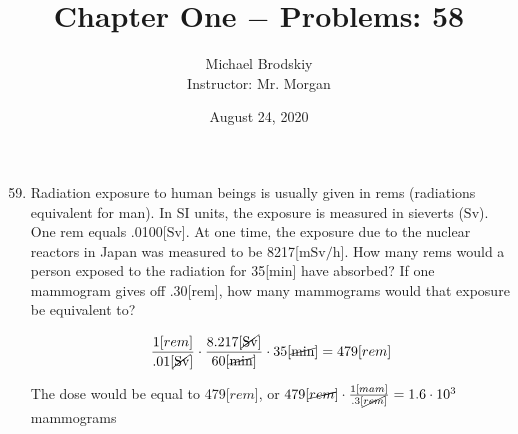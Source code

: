 \documentclass[12pt]{article}
\title{Chapter One $-$ Problems: 58}
\date{August 24, 2020}
\author{Michael Brodskiy\\ \small Instructor: Mr. Morgan}
\begin{document}
\maketitle

\begin{enumerate}
    \setcounter{enumi}{58}

  \item Radiation exposure to human beings is usually given in rems (radiations equivalent for man). In SI units, the exposure is measured in sieverts ($\si{\sievert}$). One rem equals .0100[$\si{\sievert}$]. At one time, the exposure due to the nuclear reactors in Japan was measured to be 8217[$\si{\milli\sievert\per\hour}$]. How many rems would a person exposed to the radiation for 35[$\si{\minute}$] have absorbed? If one mammogram gives off .30[rem], how many mammograms would that exposure be equivalent to?

    $$\frac{1[rem]}{.01[\cancel{\si{\sievert}}]}\cdot\frac{8.217[\cancel{\si{\sievert}}]}{60[\cancel{\si{\minute}}]}\cdot35[\cancel{\si{\minute}}]=479[rem]$$
    \begin{center} The dose would be equal to 479[$rem$], or $479[\cancel{rem}]\cdot\frac{1[mam]}{.3[\cancel{rem}]}=1.6\cdot10^3$ mammograms \end{center}

\end{enumerate}
\end{document}
